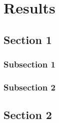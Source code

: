 
\chapter{Results} %

\label{Results} %


\section{Section 1}

\subsection{Subsection 1}



\subsection{Subsection 2}


\section{Section 2}

